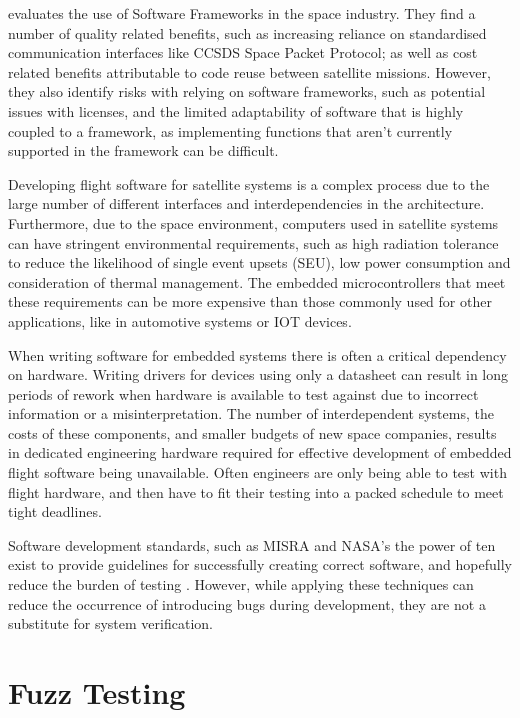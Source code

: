 \documentclass[../report.tex]{subfiles}
\begin{document}
\citet{Farges_2022} evaluates the use of Software Frameworks in the space
industry. They find a number of quality related benefits, such as increasing
reliance on standardised communication interfaces like CCSDS Space Packet
Protocol; as well as cost related benefits attributable to code reuse between
satellite missions. However, they also identify risks with relying on software
frameworks, such as potential issues with licenses, and the limited
adaptability of software that is highly coupled to a framework, as implementing
functions that aren't currently supported in the framework can be difficult.

Developing flight software for satellite systems is a complex process due to
the large number of different interfaces and interdependencies in the
architecture. Furthermore, due to the space environment, computers used in
satellite systems can have stringent environmental requirements, such as high
radiation tolerance to reduce the likelihood of single event upsets (SEU), low
power consumption and consideration of thermal management. The embedded
microcontrollers that meet these requirements can be more expensive than those
commonly used for other applications, like in automotive systems or IOT devices.

When writing software for embedded systems there is often a critical dependency
on hardware. Writing drivers for devices using only a datasheet can result in
long periods of rework when hardware is available to test against due to
incorrect information or a misinterpretation. The number of interdependent
systems, the costs of these components, and smaller budgets of new space
companies, results in dedicated engineering hardware required for effective
development of embedded flight software being unavailable. Often engineers are
only being able to test with flight hardware, and then have to fit their
testing into a packed schedule to meet tight deadlines.

Software development standards, such as MISRA and NASA's the power of ten exist
to provide guidelines for successfully creating correct software, and hopefully
reduce the burden of testing \citep{NASA_10}. However, while applying these
techniques can reduce the occurrence of introducing bugs during development,
they are not a substitute for system verification.

\section{Fuzz Testing} \label{sec:lit-rev:fuzz}
\end{document}
